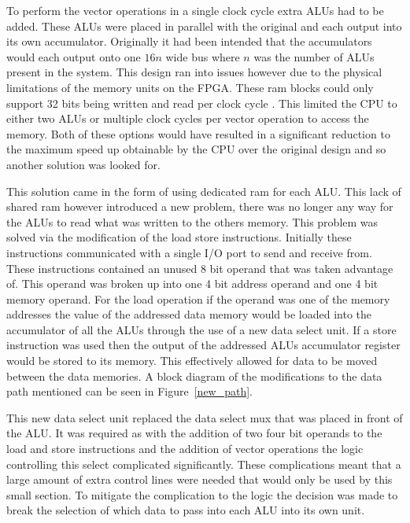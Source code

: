To perform the vector operations in a single clock cycle extra ALUs had to be added. These ALUs were placed in parallel with the original and each output into its own accumulator. Originally it had been intended that the accumulators would each output onto one $16n$ wide bus where $n$ was the number of ALUs present in the system. This design ran into issues however due to the physical limitations of the memory units on the FPGA. These ram blocks could only support 32 bits being written and read per clock cycle \cite{spartan_ram}. This limited the CPU to either two ALUs or multiple clock cycles per vector operation to access the memory. Both of these options would have resulted in a significant reduction to the maximum speed up obtainable by the CPU over the original design and so another solution was looked for.

This solution came in the form of using dedicated ram for each ALU. This lack of shared ram however introduced a new problem, there was no longer any way for the ALUs to read what was written to the others memory. This problem was solved via the modification of the load store instructions. Initially these instructions communicated with a single I/O port to send and receive from. These instructions contained an unused 8 bit operand that was taken advantage of. This operand was broken up into one 4 bit address operand and one 4 bit memory operand. For the load operation if the operand was one of the memory addresses the value of the addressed data memory would be loaded into the accumulator of all the ALUs through the use of a new data select unit. If a store instruction was used then the output of the addressed ALUs accumulator register would be stored to its memory. This effectively allowed for data to be moved between the data memories. A block diagram of the modifications to the data path mentioned can be seen in Figure~\ref{new_path}.

This new data select unit replaced the data select mux that was placed in front of the ALU. It was required as with the addition of two four bit operands to the load and store instructions and the addition of vector operations the logic controlling this select complicated significantly. These complications meant that a large amount of extra control lines were needed that would only be used by this small section. To mitigate the complication to the logic the decision was made to break the selection of which data to pass into each ALU into its own unit.

